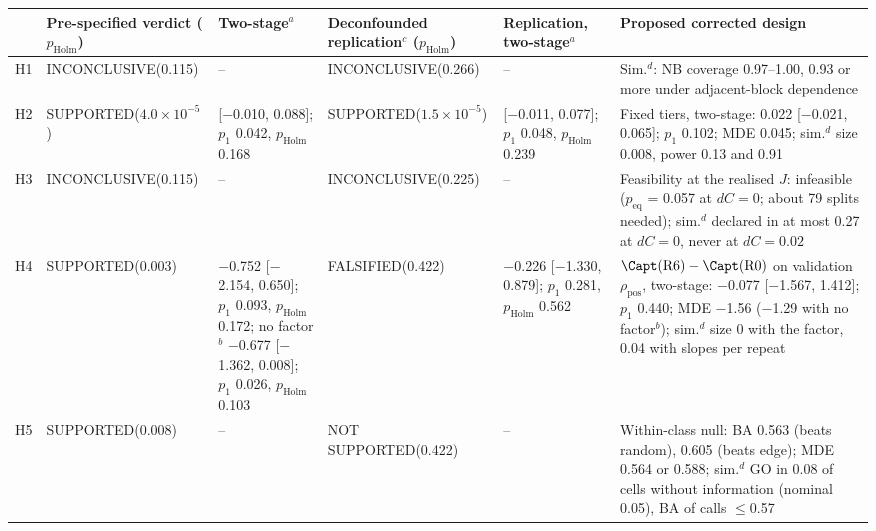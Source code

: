 \begin{tabular}{@{}l >{\raggedright\arraybackslash}p{2.1cm} >{\raggedright\arraybackslash}p{2.65cm} >{\raggedright\arraybackslash}p{2.1cm} >{\raggedright\arraybackslash}p{2.65cm} >{\raggedright\arraybackslash}p{2.7cm}@{}}
\toprule
& Pre-specified verdict ($p_{\mathrm{Holm}}$) & Two-stage$^{a}$ & Deconfounded replication$^{c}$ ($p_{\mathrm{Holm}}$) & Replication, two-stage$^{a}$ & Proposed corrected design \\
\midrule
H1 & INCONCLUSIVE\newline (0.115) & -- & INCONCLUSIVE\newline (0.266) & -- & Sim.$^{d}$: NB coverage 0.97--1.00, 0.93 or more under adjacent-block dependence \\
H2 & SUPPORTED\newline ($4.0\times10^{-5}$) & 0.039 [$-$0.010, 0.088]; $p_1$ 0.042, $p_{\mathrm{Holm}}$ 0.168 & SUPPORTED\newline ($1.5\times10^{-5}$) & 0.033 [$-$0.011, 0.077]; $p_1$ 0.048, $p_{\mathrm{Holm}}$ 0.239 & Fixed tiers, two-stage: 0.022 [$-$0.021, 0.065]; $p_1$ 0.102; MDE 0.045; sim.$^{d}$ size 0.008, power 0.13 and 0.91 \\
H3 & INCONCLUSIVE\newline (0.115) & -- & INCONCLUSIVE\newline (0.225) & -- & Feasibility at the realised $J$: infeasible ($p_{\mathrm{eq}}$ = 0.057 at $dC=0$; about 79 splits needed); sim.$^{d}$ declared in at most 0.27 at $dC=0$, never at $dC=0.02$ \\
H4 & SUPPORTED\newline (0.003) & $-$0.752 [$-$2.154, 0.650]; $p_1$ 0.093, $p_{\mathrm{Holm}}$ 0.172; no factor$^{b}$ $-$0.677 [$-$1.362, 0.008]; $p_1$ 0.026, $p_{\mathrm{Holm}}$ 0.103 & FALSIFIED\newline (0.422) & $-$0.226 [$-$1.330, 0.879]; $p_1$ 0.281, $p_{\mathrm{Holm}}$ 0.562 & $\Capt(\mathrm{R6})-\Capt(\mathrm{R0})$ on validation $\rho_{\mathrm{pos}}$, two-stage: $-$0.077 [$-$1.567, 1.412]; $p_1$ 0.440; MDE $-$1.56 ($-$1.29 with no factor$^{b}$); sim.$^{d}$ size 0 with the factor, 0.04 with slopes per repeat \\
H5 & SUPPORTED\newline (0.008) & -- & NOT SUPPORTED\newline (0.422) & -- & Within-class null: BA 0.563 (beats random), 0.605 (beats edge); MDE 0.564 or 0.588; sim.$^{d}$ GO in 0.08 of cells without information (nominal 0.05), BA of calls $\le$0.57 \\
\bottomrule
\end{tabular}
